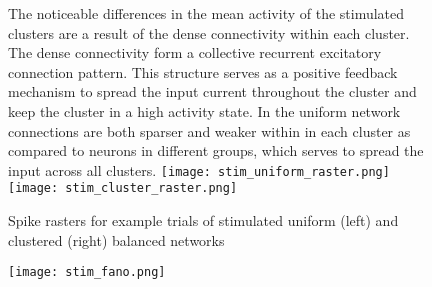 \documentclass[10pt]{article}
\begin{document}
\begin{figure}[h!]
The noticeable differences in the mean activity of the stimulated clusters are a result of the dense connectivity within each cluster. The dense connectivity form a collective recurrent excitatory connection pattern. This structure serves as a positive feedback mechanism to spread the input current throughout the  cluster and keep the cluster in a high activity state. In the uniform network connections are both sparser and weaker within in each cluster as compared to neurons in different groups, which serves to spread the input across all clusters.
 \centering
    \texttt{[image: stim\_uniform\_raster.png]}
     \texttt{[image: stim\_cluster\_raster.png]}
      \caption{Spike rasters for example trials of stimulated uniform (left) and clustered (right) balanced networks}
\end{figure}

\begin{figure}[h!]
   \centering
    \texttt{[image: stim\_fano.png]}
      \caption{}
\end{figure}
\end{document}
